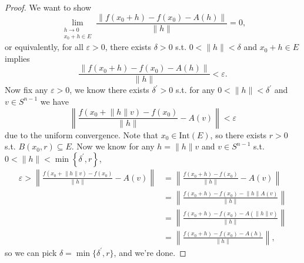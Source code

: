 \begin{proof}
    We want to show 
    \[
        \lim_{\substack{h \to 0 \\ x_0 + h \in E}} \frac{\lVert f(x_0 + h) - f(x_0) - A(h) \rVert }{\lVert h \rVert } = 0, 
    \]
    or equivalently, for all \(\varepsilon > 0\), there exists \(\delta > 0\) s.t. \(0 < \lVert h \rVert < \delta  \) and \(x_0 + h \in E\) implies 
    \[
        \frac{\lVert f(x_0 + h) - f(x_0) - A(h) \rVert }{\lVert h \rVert } < \varepsilon.
    \]  
    Now fix any \(\varepsilon > 0\), we know there exists \(\delta ^{\prime} > 0\) s.t. for any \(0 < \lVert h \rVert  < \delta ^{\prime}\) and \(v \in S^{n-1}\) we have 
    \[
        \left\lVert \frac{f(x_0 + \lVert h \rVert v ) - f(x_0)}{\lVert h \rVert } - A(v) \right\rVert < \varepsilon 
    \]      
    due to the uniform convergence. Note that \(x_0 \in \mathrm{Int}(E) \), so there exists \(r > 0\) s.t. \(B(x_0, r) \subseteq E\). Now we know for any \(h = \lVert h \rVert v \) and \(v \in S^{n-1}\) s.t. \(0 < \lVert h \rVert < \min \left\{\delta ^{\prime}, r \right\}\), 
    \begin{align*}
        \varepsilon > \left\lVert \frac{f(x_0 + \lVert h \rVert v ) - f(x_0)}{\lVert h \rVert } - A(v) \right\rVert &= \left\lVert \frac{f(x_0 + h) - f(x_0)}{\lVert h \rVert } - A(v) \right\rVert \\
        &= \left\lVert \frac{f(x_0 + h) - f(x_0) - \lVert h \rVert A(v)}{\lVert h \rVert } \right\rVert \\
        &= \left\lVert \frac{f(x_0 + h) - f(x_0) - A(\lVert h \rVert v)}{\lVert h \rVert } \right\rVert \\
        &= \left\lVert \frac{f(x_0 + h) - f(x_0) - A(h)}{\lVert h \rVert } \right\rVert,
    \end{align*}  
    so we can pick \(\delta = \min\{\delta ^{\prime} , r\}\), and we're done.
\end{proof}